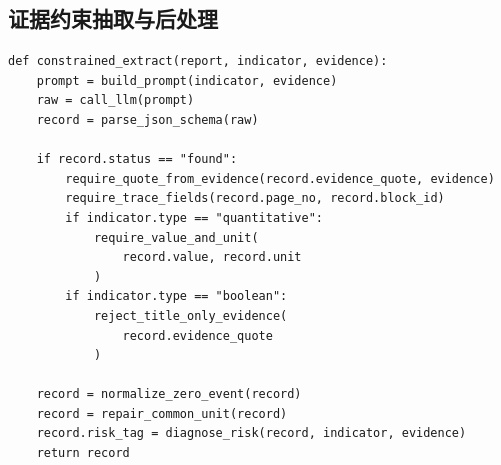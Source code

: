 \documentclass[bwprint]{gmcmthesis}
\numberwithin{figure}{section}
\begin{document}
\subsection{证据约束抽取与后处理}
\begin{Verbatim}[fontsize=\small,frame=single]
def constrained_extract(report, indicator, evidence):
    prompt = build_prompt(indicator, evidence)
    raw = call_llm(prompt)
    record = parse_json_schema(raw)

    if record.status == "found":
        require_quote_from_evidence(record.evidence_quote, evidence)
        require_trace_fields(record.page_no, record.block_id)
        if indicator.type == "quantitative":
            require_value_and_unit(
                record.value, record.unit
            )
        if indicator.type == "boolean":
            reject_title_only_evidence(
                record.evidence_quote
            )

    record = normalize_zero_event(record)
    record = repair_common_unit(record)
    record.risk_tag = diagnose_risk(record, indicator, evidence)
    return record
\end{Verbatim}
\end{document}
